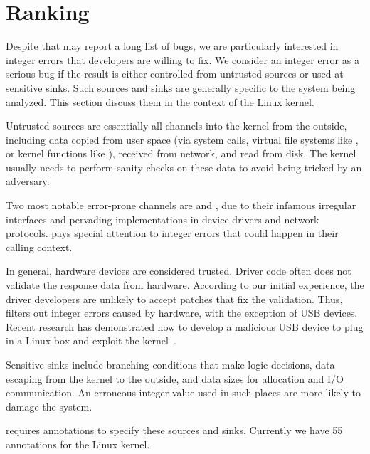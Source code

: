\section{Ranking}
\label{s:rank}

Despite that \sys may report a long list of bugs, we are particularly
interested in integer errors that developers are willing to fix.
We consider an integer error as a serious bug if the result is
either controlled from untrusted sources or used at sensitive sinks.
Such sources and sinks are generally specific to the system being
analyzed.  This section discuss them in the context of the Linux
kernel.

Untrusted sources are essentially all channels into the kernel from
the outside, including data copied from user space (via system
calls, virtual file systems like , or kernel functions
like ), received from network, and read from
disk.
The kernel usually needs to perform sanity checks on these data to
avoid being tricked by an adversary.

Two most notable error-prone channels are  and ,
due to their infamous irregular interfaces and pervading implementations
in device drivers and network protocols.  \sys pays special attention
to integer errors that could happen in their calling context.

In general, hardware devices are considered trusted.  Driver code
often does not validate the response data from hardware.  According
to our initial experience, the driver developers are unlikely to
accept patches that fix the validation.  Thus, \sys filters out
integer errors caused by hardware,
%
with the exception of USB devices.  Recent research has demonstrated
how to develop a malicious USB device to plug in a Linux box and
exploit the kernel~\cite{usb:buffer-overflow}.

Sensitive sinks include branching conditions that make logic
decisions, data escaping from the kernel to the outside, and data
sizes for allocation and I/O communication.  An erroneous integer
value used in such places are more likely to damage the system.

\sys requires annotations to specify these sources and sinks.
Currently we have 55 annotations for the Linux kernel.
